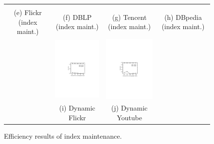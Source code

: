 \begin{figure}[htp]
\begin{tabular}{c c c c}
\begin{minipage}{3.76cm}
  \end{minipage}
  \\
  \small (e) Flickr (index maint.)
  &
  \small (f) DBLP (index maint.)
  &
  \small (g) Tencent (index maint.)
  &
  \small (h) DBpedia (index  maint.)
  \\
  &
 \begin{minipage}{3.325cm}
  \includegraphics[width=3.725cm]{figures/DynamicFlickr}
  \end{minipage}
  &
  \begin{minipage}{3.325cm}
  \includegraphics[width=3.725cm]{figures/DynamicYoutube}
  \end{minipage}
  \\ 
  &
  \small (i) Dynamic Flickr
  &
  \small (j) Dynamic Youtube
  &
\\
\end{tabular}
\caption{Efficiency results of index maintenance.}
\label{fig:exp-indexMaintenance}
\end{figure}


